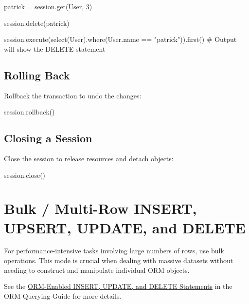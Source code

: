 \documentclass[
  letterpaper,
  DIV=11,
  numbers=noendperiod]{scrreprt}
\newenvironment{Shaded}{\begin{snugshade}}{\end{snugshade}}
\newcommand{\CommentTok}[1]{\textcolor[rgb]{0.37,0.37,0.37}{#1}}
\newcommand{\DecValTok}[1]{\textcolor[rgb]{0.68,0.00,0.00}{#1}}
\newcommand{\NormalTok}[1]{\textcolor[rgb]{0.00,0.23,0.31}{#1}}
\newcommand{\OperatorTok}[1]{\textcolor[rgb]{0.37,0.37,0.37}{#1}}
\newcommand{\StringTok}[1]{\textcolor[rgb]{0.13,0.47,0.30}{#1}}
\begin{document}
\begin{Shaded}
\begin{Highlighting}[]
\NormalTok{patrick }\OperatorTok{=}\NormalTok{ session.get(User, }\DecValTok{3}\NormalTok{)}

\NormalTok{session.delete(patrick)}

\NormalTok{session.execute(select(User).where(User.name }\OperatorTok{==} \StringTok{"patrick"}\NormalTok{)).first()}
\CommentTok{\# Output will show the DELETE statement}
\end{Highlighting}
\end{Shaded}

\subsection{Rolling Back}\label{rolling-back}

Rollback the transaction to undo the changes:

\begin{Shaded}
\begin{Highlighting}[]
\NormalTok{session.rollback()}
\end{Highlighting}
\end{Shaded}

\subsection{Closing a Session}\label{closing-a-session}

Close the session to release resources and detach objects:

\begin{Shaded}
\begin{Highlighting}[]
\NormalTok{session.close()}
\end{Highlighting}
\end{Shaded}

\section{Bulk / Multi-Row INSERT, UPSERT, UPDATE, and
DELETE}\label{bulk-multi-row-insert-upsert-update-and-delete}

For performance-intensive tasks involving large numbers of rows, use
bulk operations. This mode is crucial when dealing with massive datasets
without needing to construct and manipulate individual ORM objects.

See the
\href{https://docs.sqlalchemy.org/en/14/orm/query.html\#orm-enabled-insert-update-and-delete}{ORM-Enabled
INSERT, UPDATE, and DELETE Statements} in the ORM Querying Guide for
more details.
\end{document}
